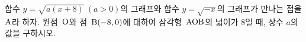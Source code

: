 함수 $y=\sqrt{a(x+8)}\ (a>0)$의 그래프와 함수 $y=\sqrt{-x}$의 그래프가 만나는 점을 $\mathrm{A}$라 하자. 원점~$\mathrm{O}$와 점~$\mathrm{B}(-8{,}\mkern3mu\mathopen{}0)$에 대하여 삼각형~$\mathrm{AOB}$의 넓이가 $8$일 때, 상수 $a$의 값을 구하시오.
